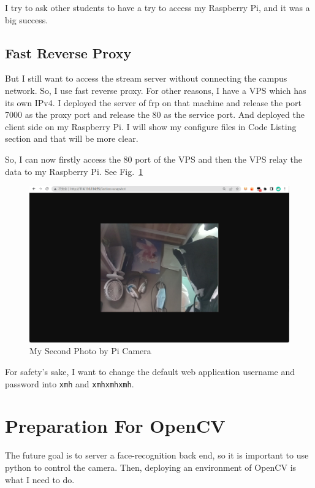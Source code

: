 \documentclass{article}
\begin{document}
 I try to ask other students to have a try to access my Raspberry Pi, and it was a big success.

\subsection{Fast Reverse Proxy}

But I still want to access the stream server without connecting the campus network. So, I use fast reverse proxy\cite{gh:frp}. For other reasons, I have a VPS which has its own IPv4. I deployed the server of frp on that machine and release the port 7000 as the proxy port and release the 80 as the service port. And deployed the client side on my Raspberry Pi. I will show my configure files in Code Listing section and that will be more clear.

So, I can now firstly access the 80 port of the VPS and then the VPS relay the data to my Raspberry Pi. See Fig.~\ref{fig:SecondPicOfPicam}

\begin{figure}[!h]
	\centering
	\includegraphics[width=5 in]{../pic/SecondPicOfPicam.png}
	\caption{My Second Photo by Pi Camera}
	\label{fig:SecondPicOfPicam}
\end{figure}

For safety's sake, I want to change the default web application username and password into \verb|xmh| and \verb|xmhxmhxmh|.

\section{Preparation For OpenCV}
The future goal is to server a face-recognition back end, so it is important to use python to control the camera. Then, deploying an environment of OpenCV is what I need to do. 
\end{document}
